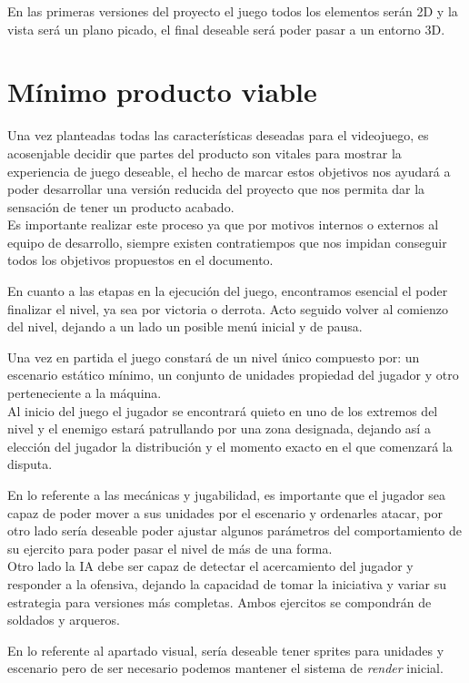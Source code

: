 En las primeras versiones del proyecto el juego todos los elementos serán 2D y la vista será
un plano picado, el final deseable será poder pasar a un entorno 3D.

\section{Mínimo producto viable}
Una vez planteadas todas las características deseadas para el videojuego, es acosenjable
decidir que partes del producto son vitales para mostrar la experiencia
de juego deseable, el hecho de marcar estos objetivos nos ayudará a poder desarrollar una
versión reducida del proyecto que nos permita dar la sensación de tener un producto acabado.\\
Es importante realizar este proceso ya que por motivos internos o externos al equipo de desarrollo,
siempre existen contratiempos que nos impidan conseguir todos los objetivos propuestos en el
documento.

En cuanto a las etapas en la ejecución del juego, encontramos esencial el poder finalizar el nivel,
ya sea por victoria o derrota. Acto seguido volver al comienzo del nivel, dejando a un lado un
posible menú inicial y de pausa.

Una vez en partida el juego constará de un nivel único compuesto por: un escenario estático
mínimo, un conjunto de unidades propiedad del jugador y otro perteneciente a la máquina.\\
Al inicio del juego el jugador se encontrará quieto en uno de los extremos del nivel y el enemigo 
estará patrullando por una zona designada, dejando así a elección del jugador la distribución y el
momento exacto en el que comenzará la disputa.

En lo referente a las mecánicas y jugabilidad, es importante que el jugador sea capaz de poder
mover a sus unidades por el escenario y ordenarles atacar, por otro lado sería deseable poder
ajustar algunos parámetros del comportamiento de su ejercito para poder pasar el nivel de más
de una forma.\\
Otro lado la \ac{IA} debe ser capaz de detectar el acercamiento del jugador y responder a la
ofensiva, dejando la capacidad de tomar la iniciativa y variar su estrategia para versiones
más completas. Ambos ejercitos se compondrán de soldados y arqueros.

En lo referente al apartado visual, sería deseable tener sprites para unidades y escenario pero
de ser necesario podemos mantener el sistema de \textit{render} inicial.


